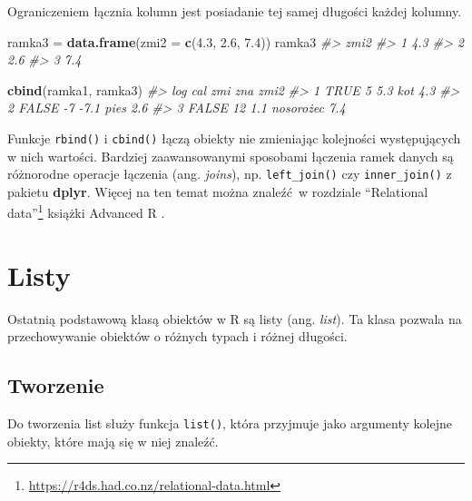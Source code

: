 \documentclass[paper=6in:9in,pagesize=pdftex,headinclude=on,footinclude=on,10pt]{scrbook}
\makeatletter
\newenvironment{Shaded}{\begin{snugshade}}{\end{snugshade}}
\newcommand{\CommentTok}[1]{\textcolor[rgb]{0.56,0.35,0.01}{\textit{#1}}}
\newcommand{\DataTypeTok}[1]{\textcolor[rgb]{0.13,0.29,0.53}{#1}}
\newcommand{\FloatTok}[1]{\textcolor[rgb]{0.00,0.00,0.81}{#1}}
\newcommand{\KeywordTok}[1]{\textcolor[rgb]{0.13,0.29,0.53}{\textbf{#1}}}
\newcommand{\NormalTok}[1]{#1}
\newcommand{\StringTok}[1]{\textcolor[rgb]{0.31,0.60,0.02}{#1}}
\DeclareRobustCommand{\href}[2]{#2\footnote{\url{#1}}}
\newenvironment{kframe}{%
\medskip{}
\setlength{\fboxsep}{.8em}
 \def\at@end@of@kframe{}%
 \ifinner\ifhmode%
  \def\at@end@of@kframe{\end{minipage}}%
  \begin{minipage}{\columnwidth}%
 \fi\fi%
 \def\FrameCommand##1{\hskip\@totalleftmargin \hskip-\fboxsep
 \colorbox{shadecolor}{##1}\hskip-\fboxsep
     \hskip-\linewidth \hskip-\@totalleftmargin \hskip\columnwidth}%
 \MakeFramed {\advance\hsize-\width
   \@totalleftmargin\z@ \linewidth\hsize
   \@setminipage}}%
 {\par\unskip\endMakeFramed%
 \at@end@of@kframe}
\newenvironment{rmdblock}[1]
  {
  \begin{itemize}
  \renewcommand{\labelitemi}{
    \raisebox{-.7\height}[0pt][0pt]{
      {\setkeys{Gin}{width=3em,keepaspectratio}\texttt{[image: images/\#1]}}
    }
  }
  \setlength{\fboxsep}{1em}
  \begin{kframe}
  \item
  }
  {
  \end{kframe}
  \end{itemize}
  }
\newenvironment{rmdinfo}
  {\begin{rmdblock}{compass}}
  {\end{rmdblock}}
\makeatother
\begin{document}
Ograniczeniem łącznia kolumn jest posiadanie tej samej długości każdej kolumny.

\begin{Shaded}
\begin{Highlighting}[]
\NormalTok{ramka3 =}\StringTok{ }\KeywordTok{data.frame}\NormalTok{(}\DataTypeTok{zmi2 =} \KeywordTok{c}\NormalTok{(}\FloatTok{4.3}\NormalTok{, }\FloatTok{2.6}\NormalTok{, }\FloatTok{7.4}\NormalTok{))}
\NormalTok{ramka3}
\CommentTok{#>   zmi2}
\CommentTok{#> 1  4.3}
\CommentTok{#> 2  2.6}
\CommentTok{#> 3  7.4}

\KeywordTok{cbind}\NormalTok{(ramka1, ramka3)}
\CommentTok{#>     log cal  zmi       zna zmi2}
\CommentTok{#> 1  TRUE   5  5.3       kot  4.3}
\CommentTok{#> 2 FALSE  -7 -7.1      pies  2.6}
\CommentTok{#> 3 FALSE  12  1.1 nosorożec  7.4}
\end{Highlighting}
\end{Shaded}

\begin{rmdinfo}
\begin{rmdinfo}

Funkcje \texttt{rbind()} i \texttt{cbind()} łączą obiekty nie zmieniając kolejności występujących w nich wartości.
Bardziej zaawansowanymi sposobami łączenia ramek danych są różnorodne operacje łączenia (ang. \emph{joins}), np. \texttt{left\_join()} czy \texttt{inner\_join()} z pakietu \textbf{dplyr}.
Więcej na ten temat można znaleźć~w rozdziale \href{https://r4ds.had.co.nz/relational-data.html}{``Relational data''} książki Advanced R \citep{wickham2014advanced}.

\end{rmdinfo}
\end{rmdinfo}

\hypertarget{listy}{%
\section{Listy}\label{listy}}

Ostatnią podstawową klasą obiektów w R są listy (ang. \emph{list}).
Ta klasa pozwala na przechowywanie obiektów o różnych typach i różnej długości.

\hypertarget{tworzenie-2}{%
\subsection{Tworzenie}\label{tworzenie-2}}

Do tworzenia list służy funkcja \texttt{list()}, która przyjmuje jako argumenty kolejne obiekty, które mają się w niej znaleźć.
\end{document}
